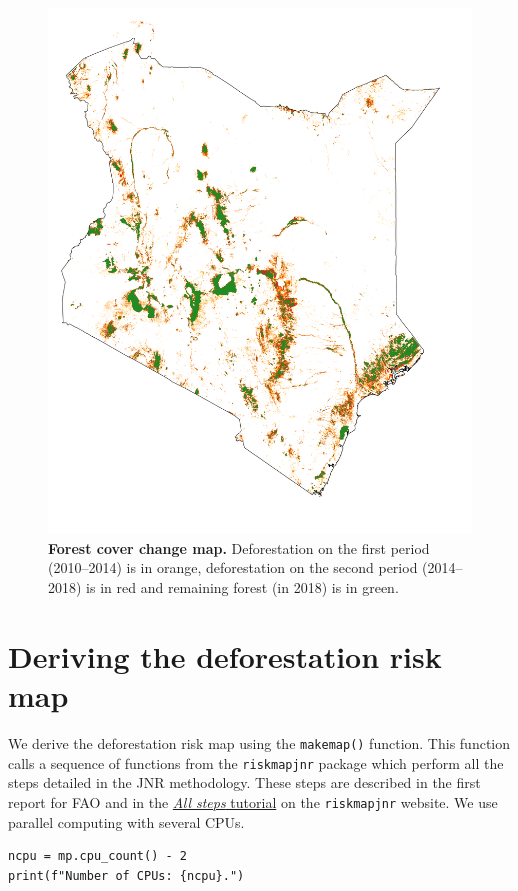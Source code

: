 \documentclass[paper=a4, 12pt, DIV=12]{scrartcl}
\begin{document}
\begin{figure}[H]
\centering
\includegraphics[width=0.8\linewidth]{outputs_kenya/fcc123.png}
\caption{\label{fig:orgbf18787}\textbf{Forest cover change map.} Deforestation on the first period (2010--2014) is in orange, deforestation on the second period (2014--2018) is in red and remaining forest (in 2018) is in green.}
\end{figure}

\section{Deriving the deforestation risk map}
\label{sec:orge1a2ea0}

We derive the deforestation risk map using the \texttt{makemap()} function. This function calls a sequence of functions from the \texttt{riskmapjnr} package which perform all the steps detailed in the JNR methodology. These steps are described in the first report for FAO and in the \href{https://ecology.ghislainv.fr/riskmapjnr/notebooks/steps.html}{\emph{All steps} tutorial} on the \texttt{riskmapjnr} website. We use parallel computing with several CPUs.

\begin{verbatim}
ncpu = mp.cpu_count() - 2
print(f"Number of CPUs: {ncpu}.") 
\end{verbatim}
\end{document}
